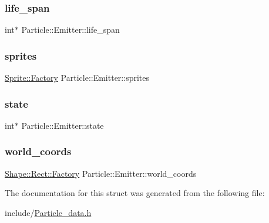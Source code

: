 \subsubsection{\texorpdfstring{life\+\_\+span}{life\_span}}
{\footnotesize\ttfamily int$\ast$ Particle\+::\+Emitter\+::life\+\_\+span}

\mbox{\label{struct_particle_1_1_emitter_ab0e080daafa54b6a8efd11c9f61c38a9}} 
\subsubsection{\texorpdfstring{sprites}{sprites}}
{\footnotesize\ttfamily \mbox{\hyperlink{struct_sprite_1_1_factory}{Sprite\+::\+Factory}} Particle\+::\+Emitter\+::sprites}

\mbox{\label{struct_particle_1_1_emitter_a261cfd3f38c02b2aaaf4f7cd04c9ff08}} 
\subsubsection{\texorpdfstring{state}{state}}
{\footnotesize\ttfamily int$\ast$ Particle\+::\+Emitter\+::state}

\mbox{\label{struct_particle_1_1_emitter_a1bd409e916c09c0c07fb1d4b812eb040}} 
\subsubsection{\texorpdfstring{world\+\_\+coords}{world\_coords}}
{\footnotesize\ttfamily \mbox{\hyperlink{struct_shape_1_1_rect_1_1_factory}{Shape\+::\+Rect\+::\+Factory}} Particle\+::\+Emitter\+::world\+\_\+coords}



The documentation for this struct was generated from the following file\+:\begin{DoxyCompactItemize}
\item 
include/\mbox{\hyperlink{_particle__data_8h}{Particle\+\_\+data.\+h}}\end{DoxyCompactItemize}
